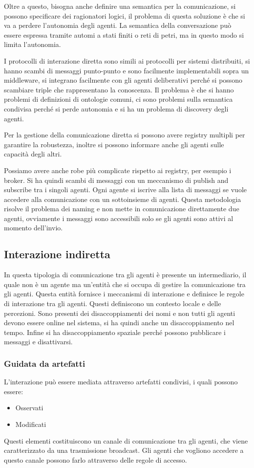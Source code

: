 Oltre a questo, bisogna anche definire una semantica per la comunicazione, si
possono specificare dei ragionatori logici, il problema di questa soluzione è
che si va a perdere l'autonomia degli agenti. La semantica della conversazione può essere espressa tramite automi a stati finiti
o reti di petri, ma in questo modo si limita l'autonomia.

I protocolli di interazione diretta sono simili ai protocolli per sistemi distribuiti,
si hanno scambi di messaggi punto-punto e sono facilmente implementabili sopra
un middleware, si integrano facilmente con gli agenti deliberativi perché si possono
scambiare triple che rappresentano la conoscenza. Il problema è che si hanno problemi di definizioni di ontologie
comuni, ci sono problemi sulla semantica condivisa perché si perde autonomia e si ha un
problema di discovery degli agenti.

Per la gestione della comunicazione diretta si possono avere registry multipli
per garantire la robustezza, inoltre si possono informare anche gli agenti sulle
capacità degli altri.

Possiamo avere anche robe più complicate rispetto ai registry, per esempio i broker.
Si ha quindi scambi di messaggi con un meccanismo di publish and subscribe tra
i singoli agenti. Ogni agente si iscrive alla lista di messaggi se vuole accedere
alla comunicazione con un sottoinsieme di agenti. Questa metodologia risolve il
problema dei naming e non mette in comunicazione direttamente due agenti,
ovviamente i messaggi sono accessibili solo se gli agenti sono attivi al momento
dell'invio.
\subsection{Interazione indiretta}
In questa tipologia di comunicazione tra gli agenti è presente un intermediario,
il quale non è un agente ma un'entità che si occupa di gestire la comunicazione
tra gli agenti. Questa entità fornisce i meccanismi di interazione e
definisce le regole di interazione tra gli agenti. Questi definiscono un
contesto locale e delle percezioni. Sono presenti dei disaccoppiamenti
dei nomi e non tutti gli agenti devono essere online nel sistema, si ha quindi
anche un disaccoppiamento nel tempo. Infine si ha disaccoppiamento spaziale
perché possono pubblicare i messaggi e disattivarsi.
\subsubsection{Guidata da artefatti}
L'interazione può essere mediata attraverso artefatti condivisi, i quali possono
essere:
\begin{itemize}
    \item Osservati
    \item Modificati
\end{itemize}
Questi elementi costituiscono un canale di comunicazione tra gli agenti, che
viene caratterizzato da una trasmissione broadcast. Gli agenti che vogliono
accedere a questo canale possono farlo attraverso delle regole di accesso.


